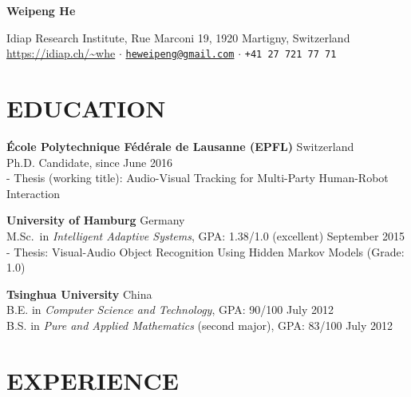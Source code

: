 \documentclass[a4paper,11pt]{article} %
\newcommand{\ind}{\hspace*{1em}}
\begin{document}
\thispagestyle{empty}


\begin{center}
  {\Huge\bfseries Weipeng He}

  Idiap Research Institute, Rue Marconi 19, 1920 Martigny, Switzerland \\
  \url{https://idiap.ch/~whe} $\cdotp$
  \href{mailto:heweipeng@gmail.com}{\texttt{heweipeng@gmail.com}} $\cdotp$
  \texttt{+41 27 721 77 71}
\end{center}


\section{EDUCATION}
\textbf{\'Ecole Polytechnique F\'ed\'erale de Lausanne (EPFL)} \hfill Switzerland \\
\ind Ph.D. Candidate, \hfill since June 2016 \\
\ind - Thesis (working title): Audio-Visual Tracking for Multi-Party Human-Robot Interaction

\textbf{University of Hamburg} \hfill Germany \\
\ind M.Sc.\ in \textit{Intelligent Adaptive Systems}, GPA: 1.38/1.0 (excellent)  \hfill September 2015 \\
\ind - Thesis: Visual-Audio Object Recognition Using Hidden Markov Models (Grade: 1.0)

\textbf{Tsinghua University} \hfill China \\
\ind B.E. in \textit{Computer Science and Technology}, GPA: 90/100 \hfill July 2012 \\
\ind B.S. in \textit{Pure and Applied Mathematics} (second major), GPA: 83/100 \hfill July 2012


\section{EXPERIENCE}
\end{document}
